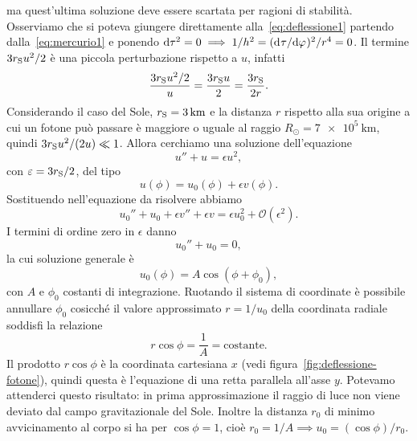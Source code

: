 ma quest'ultima soluzione deve essere scartata per ragioni di stabilità.
Osserviamo che si poteva giungere direttamente alla~\eqref{eq:deflessione1}
partendo dalla~\eqref{eq:mercurio1} e ponendo
$\dd\tau^{2} = 0 \implies 1/h^{2} = (\ltoder{\tau}{\phi})^{2}/r^{4} = 0$.  Il
termine $3r_{\textup{S}}u^{2}/2$ è una piccola perturbazione rispetto a $u$,
infatti
\begin{equation}
  \frac{3r_{\textup{S}}u^{2}/2}{u} = \frac{3r_{\textup{S}}u}{2} =
  \frac{3r_{\textup{S}}}{2r}.
\end{equation}
Considerando il caso del Sole, $r_{\textup{S}} = \SI{3}{\kilo\metre}$ e la
distanza $r$ rispetto alla sua origine a cui un fotone può passare è maggiore o
uguale al raggio $R_{\odot} = \SI{7e5}{\kilo\metre}$, quindi
$3r_{\textup{S}}u^{2}/(2u) \ll 1$.  Allora cerchiamo una soluzione dell'equazione
\begin{equation}
  u'' + u = \epsilon u^{2},
\end{equation}
con $\epsilon = 3r_{\textup{S}}/2$, del tipo
\begin{equation}
  u(\phi) = u_{0}(\phi) + \epsilon v(\phi).
\end{equation}
Sostituendo nell'equazione da risolvere abbiamo
\begin{equation}
  \label{eq:deflessione2}
  u_{0}'' + u_{0} + \epsilon v'' + \epsilon v = \epsilon u_{0}^{2} +
  \mathcal{O}(\epsilon^{2}).
\end{equation}
I termini di ordine zero in $\epsilon$ danno
\begin{equation}
  u_{0}'' + u_{0} = 0,
\end{equation}
la cui soluzione generale è
\begin{equation}
  u_{0}(\phi) = A\cos(\phi + \phi_{0}),
\end{equation}
con $A$ e $\phi_{0}$ costanti di integrazione.  Ruotando il sistema di
coordinate è possibile annullare $\phi_{0}$ cosicché il valore approssimato
$r = 1/u_{0}$ della coordinata radiale soddisfi la relazione
\begin{equation}
  r \cos\phi = \frac{1}{A} = \text{costante}.
\end{equation}
Il prodotto $r\cos\phi$ è la coordinata cartesiana $x$ (vedi
figura~\ref{fig:deflessione-fotone}), quindi questa è l'equazione di una retta
parallela all'asse $y$.  Potevamo attenderci questo risultato: in prima
approssimazione il raggio di luce non viene deviato dal campo gravitazionale del
Sole.  Inoltre la distanza $r_{0}$ di minimo avvicinamento al corpo si ha per
$\cos\phi = 1$, cioè $r_{0} = 1/A \implies u_{0} = (\cos\phi)/r_{0}$.
